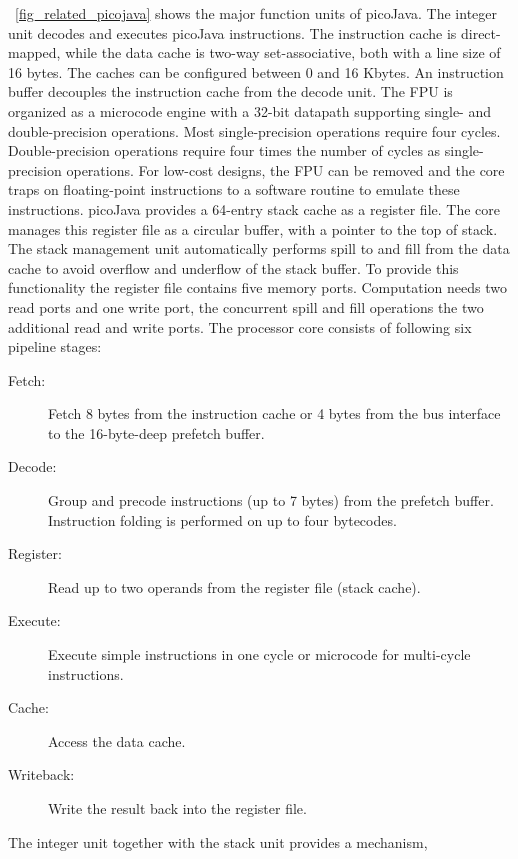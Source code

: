 \figurename~\ref{fig_related_picojava} shows the major function
units of picoJava. The integer unit decodes and executes picoJava
instructions. The instruction cache is direct-mapped, while the data
cache is two-way set-associative, both with a line size of 16 bytes.
The caches can be configured between 0 and 16 Kbytes. An instruction
buffer decouples the instruction cache from the decode unit. The FPU
is organized as a microcode engine with a 32-bit datapath supporting
single- and double-precision operations. Most single-precision
operations require four cycles. Double-precision operations require
four times the number of cycles as single-precision operations. For
low-cost designs, the FPU can be removed and the core traps on
floating-point instructions to a software routine to emulate these
instructions. picoJava provides a 64-entry stack cache as a register
file. The core manages this register file as a circular buffer, with
a pointer to the top of stack. The stack management unit
automatically performs spill to and fill from the data cache to
avoid overflow and underflow of the stack buffer. To provide this
functionality the register file contains five memory ports.
Computation needs two read ports and one write port, the concurrent
spill and fill operations the two additional read and write ports.
The processor core consists of following six pipeline stages:
%
\begin{description}

\item[Fetch:]
Fetch 8 bytes from the instruction cache or 4 bytes from the bus
interface to the 16-byte-deep prefetch buffer.

\item[Decode:]
Group and precode instructions (up to 7 bytes) from the prefetch
buffer. Instruction folding is performed on up to four bytecodes.

\item[Register:]
Read up to two operands from the register file (stack cache).

\item[Execute:]
Execute simple instructions in one cycle or microcode for
multi-cycle instructions.

\item[Cache:]
Access the data cache.

\item[Writeback:]
Write the result back into the register file.

\end{description}
%
The integer unit together with the stack unit provides a mechanism,
